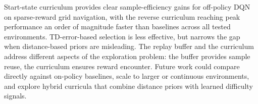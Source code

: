 \documentclass{article}
\begin{document}
Start-state curriculum provides clear sample-efficiency gains for
off-policy DQN on sparse-reward grid navigation, with the reverse
curriculum reaching peak performance an order of magnitude faster than
baselines across all tested environments. TD-error-based selection is less effective, but narrows the gap when distance-based
priors are misleading. The replay buffer and the curriculum address
different aspects of the exploration problem: the buffer provides sample
reuse, the curriculum ensures reward encounter. Future work could compare directly against on-policy baselines, scale to larger or continuous
environments, and explore hybrid curricula that combine distance priors
with learned difficulty signals.




\end{document}

